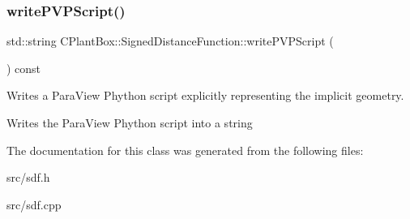 \mbox{\label{classCPlantBox_1_1SignedDistanceFunction_a4b7fe3a943e52f35b0e27187edcef640}} 
\subsubsection{\texorpdfstring{write\+P\+V\+P\+Script()}{writePVPScript()}\hspace{0.1cm}{\footnotesize\ttfamily [2/2]}}
{\footnotesize\ttfamily std\+::string C\+Plant\+Box\+::\+Signed\+Distance\+Function\+::write\+P\+V\+P\+Script (\begin{DoxyParamCaption}{ }\end{DoxyParamCaption}) const\hspace{0.3cm}{\ttfamily [virtual]}}



Writes a Para\+View Phython script explicitly representing the implicit geometry. 

Writes the Para\+View Phython script into a string 

The documentation for this class was generated from the following files\+:\begin{DoxyCompactItemize}
\item 
src/sdf.\+h\item 
src/sdf.\+cpp\end{DoxyCompactItemize}
